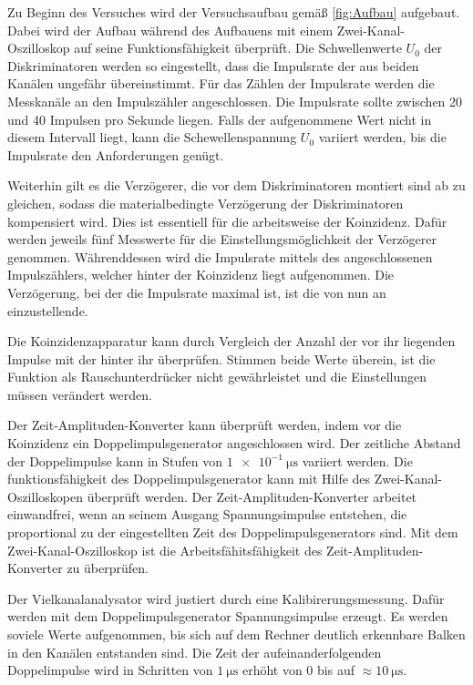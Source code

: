 Zu Beginn des Versuches wird der Versuchsaufbau gemäß \ref{fig:Aufbau} aufgebaut.
Dabei wird der Aufbau während des Aufbauens mit einem Zwei-Kanal-Oszilloskop
auf seine Funktionsfähigkeit überprüft.
Die Schwellenwerte $U_0$ der Diskriminatoren werden so eingestellt, dass
die Impulsrate der aus beiden Kanälen ungefähr übereinstimmt. Für das Zählen der
Impulsrate werden die Messkanäle an den Impulszähler angeschlossen.
Die Impulsrate sollte zwischen 20 und 40 Impulsen pro Sekunde liegen.
Falls der aufgenommene Wert nicht in diesem Intervall liegt, kann die
Schewellenspannung $U_0$ variiert werden, bis die Impulsrate den Anforderungen genügt.

Weiterhin gilt es die Verzögerer, die vor dem Diskriminatoren montiert sind
ab zu gleichen, sodass die materialbedingte Verzögerung der Diskriminatoren
kompensiert wird. Dies ist essentiell für die arbeitsweise der Koinzidenz.
Dafür werden jeweils fünf Messwerte für die Einstellungsmöglichkeit der Verzögerer genommen.
Währenddessen wird die Impulsrate mittels des angeschlossenen Impulszählers, welcher hinter
der Koinzidenz liegt aufgenommen.
Die Verzögerung, bei der die Impulsrate maximal ist, ist die von nun an einzustellende.

Die Koinzidenzapparatur kann durch Vergleich der Anzahl der vor ihr liegenden
Impulse mit der hinter ihr überprüfen. Stimmen beide Werte überein, ist
die Funktion als Rauschunterdrücker nicht gewährleistet und die Einstellungen müssen
verändert werden.

Der Zeit-Amplituden-Konverter kann überprüft werden, indem vor die Koinzidenz ein
Doppelimpulsgenerator angeschlossen wird. Der zeitliche Abstand der
Doppelimpulse kann in Stufen von $\SI{1e-1}{\micro\second}$ variiert werden.
Die funktionsfähigkeit des Doppelimpulsgenerator kann mit Hilfe des
Zwei-Kanal-Oszilloskopen überprüft werden.
Der Zeit-Amplituden-Konverter arbeitet einwandfrei, wenn an seinem
Ausgang Spannungsimpulse entstehen, die proportional zu der
eingestellten Zeit des Doppelimpulsgenerators sind. Mit dem Zwei-Kanal-Oszilloskop
ist die Arbeitsfähitsfähigkeit des Zeit-Amplituden-Konverter zu überprüfen.

Der Vielkanalanalysator wird justiert durch eine Kalibirerungsmessung.
Dafür werden mit dem Doppelimpulsgenerator Spannungsimpulse erzeugt.
Es werden soviele Werte aufgenommen, bis sich auf dem Rechner deutlich
erkennbare Balken in den Kanälen entstanden sind.
Die Zeit der aufeinanderfolgenden Doppelimpulse wird in Schritten von $\SI{1}{\micro\second}$
erhöht von 0 bis auf $\approx \SI{10}{\micro\second}$.
